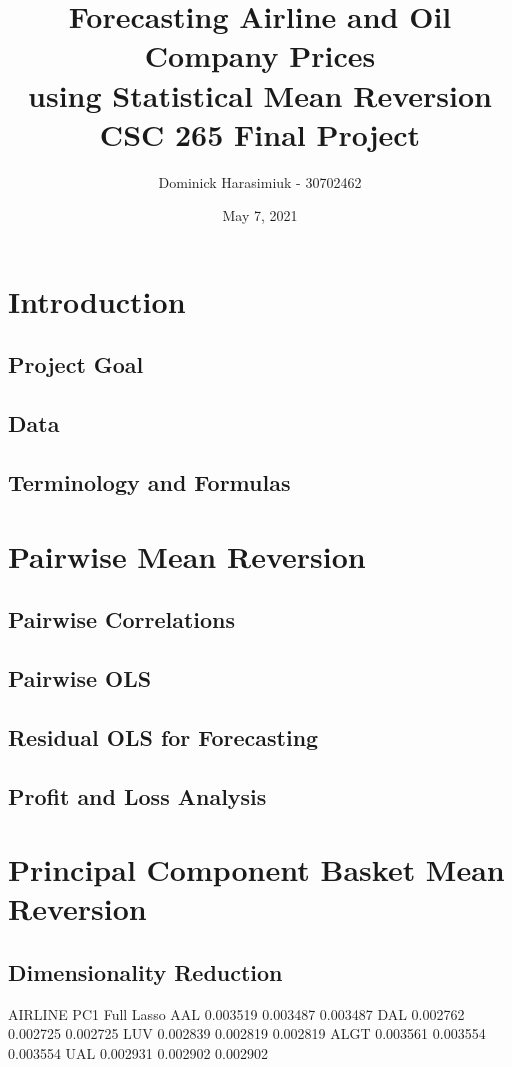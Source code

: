 \documentclass{article}
\title{Forecasting Airline and Oil Company Prices \\
using Statistical Mean Reversion \\
\large CSC 265 Final Project}
\author{Dominick Harasimiuk - 30702462}
\date{May 7, 2021}
\begin{document}
\maketitle

\vspace{1cm}

\begin{abstract}
\noindent
\lipsum[1]
\end{abstract}

\newpage
\section{Introduction}
\subsection{Project Goal}
\subsection{Data}
\subsection{Terminology and Formulas}

\section{Pairwise Mean Reversion}
\subsection{Pairwise Correlations}
\subsection{Pairwise OLS}
\subsection{Residual OLS for Forecasting}
\subsection{Profit and Loss Analysis}

\section{Principal Component Basket Mean Reversion}
\subsection{Dimensionality Reduction}
AIRLINE
PC1	Full	Lasso
AAL	0.003519	0.003487	0.003487
DAL	0.002762	0.002725	0.002725
LUV	0.002839	0.002819	0.002819
ALGT	0.003561	0.003554	0.003554
UAL	0.002931	0.002902	0.002902
\end{document}
